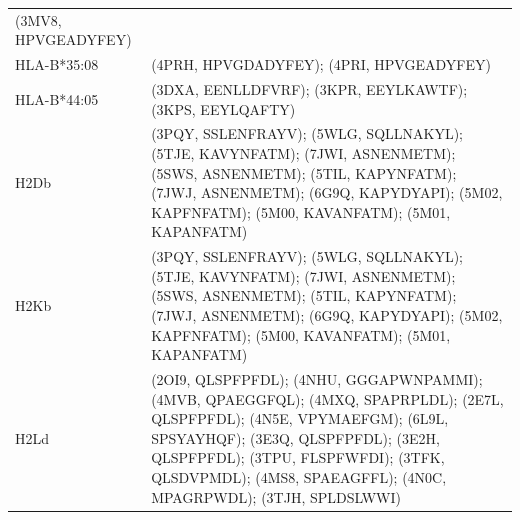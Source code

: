 \begin{table}[ht]
{\begin{tabular}{l p{16cm}}
(3MV8, HPVGEADYFEY) \\
HLA-B*35:08 & (4PRH, HPVGDADYFEY); (4PRI, HPVGEADYFEY) \\
HLA-B*44:05 & (3DXA, EENLLDFVRF); (3KPR, EEYLKAWTF); (3KPS, EEYLQAFTY) \\
H2Db & (3PQY, SSLENFRAYV); (5WLG, SQLLNAKYL); (5TJE, KAVYNFATM); (7JWI, ASNENMETM); (5SWS,
ASNENMETM); (5TIL, KAPYNFATM); (7JWJ, ASNENMETM); (6G9Q, KAPYDYAPI); (5M02, KAPFNFATM); (5M00,
KAVANFATM); (5M01, KAPANFATM) \\
H2Kb & (3PQY, SSLENFRAYV); (5WLG, SQLLNAKYL); (5TJE, KAVYNFATM); (7JWI, ASNENMETM); (5SWS,
ASNENMETM); (5TIL, KAPYNFATM); (7JWJ, ASNENMETM); (6G9Q, KAPYDYAPI); (5M02, KAPFNFATM); (5M00,
KAVANFATM); (5M01, KAPANFATM) \\
H2Ld & (2OI9, QLSPFPFDL); (4NHU, GGGAPWNPAMMI); (4MVB, QPAEGGFQL); (4MXQ, SPAPRPLDL); (2E7L,
QLSPFPFDL); (4N5E, VPYMAEFGM); (6L9L, SPSYAYHQF); (3E3Q, QLSPFPFDL); (3E2H, QLSPFPFDL); (3TPU,
FLSPFWFDI); (3TFK, QLSDVPMDL); (4MS8, SPAEAGFFL); (4N0C, MPAGRPWDL); (3TJH, SPLDSLWWI) \\
\hline
\end{tabular}}
\label{table:specificity_info}
\end{table}



